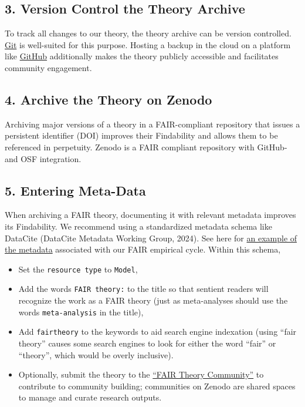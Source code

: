 \documentclass[
  man, noextraspace,floatsintext]{apa7}
\providecommand{\tightlist}{%
  \setlength{\itemsep}{0pt}\setlength{\parskip}{0pt}}
\begin{document}
\subsection{3. Version Control the Theory Archive}\label{version-control-the-theory-archive}

To track all changes to our theory, the theory archive can be version controlled.
\href{https://git-scm.com/book/en/v2/Getting-Started-Installing-Git}{Git} is well-suited for this purpose.
Hosting a backup in the cloud on a platform like \href{https://github.blog/developer-skills/github/beginners-guide-to-github-repositories-how-to-create-your-first-repo/}{GitHub} additionally makes the theory publicly accessible and facilitates community engagement.

\subsection{4. Archive the Theory on Zenodo}\label{archive-the-theory-on-zenodo}

Archiving major versions of a theory in a FAIR-compliant repository that issues a persistent identifier (DOI) improves their Findability and allows them to be referenced in perpetuity.
Zenodo is a FAIR compliant repository with GitHub- and OSF integration.

\subsection{5. Entering Meta-Data}\label{entering-meta-data}

When archiving a FAIR theory, documenting it with relevant metadata improves its Findability.
We recommend using a standardized metadata schema like DataCite (DataCite Metadata Working Group, 2024).
See here for \href{https://github.com/cjvanlissa/fair_theory/blob/3b4894da576cb76d19e911a05dd513d5172058ec/example_metadata.json}{an example of the metadata} associated with our FAIR empirical cycle.
Within this schema,

\begin{itemize}
\tightlist
\item
  Set the \texttt{resource\ type} to \texttt{Model},
\item
  Add the words \texttt{FAIR\ theory:} to the title so that sentient readers will recognize the work as a FAIR theory (just as meta-analyses should use the words \texttt{meta-analysis} in the title),
\item
  Add \texttt{fairtheory} to the keywords to aid search engine indexation (using ``fair theory'' causes some search engines to look for either the word ``fair'' or ``theory'', which would be overly inclusive).
\item
  Optionally, submit the theory to the \href{https://zenodo.org/communities/fairtheory}{``FAIR Theory Community''} to contribute to community building; communities on Zenodo are shared spaces to manage and curate research outputs.
\end{itemize}
\end{document}
